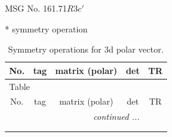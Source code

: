 \documentclass[fleqn,8pt]{jsarticle}
\begin{document}
\setcounter{MaxMatrixCols}{32}

\renewcommand{\tablename}{Table~}
\renewcommand{\figurename}{Figure~}
\begin{center}
\LARGE
MSG No. 161.71\quad$R3c'$
\end{center}
* symmetry operation
\renewcommand{\arraystretch}{1.3}
\begin{longtable}{ccccc}
\caption{Symmetry operations for 3d polar vector.}
 \\
 \hline \hline
No. & tag & matrix (polar) & det & TR \\ \hline \endfirsthead

\multicolumn{4}{l}{\tablename\ \thetable{}} \\
 \hline \hline
No. & tag & matrix (polar) & det & TR \\ \hline \endhead

 \hline \hline
\multicolumn{4}{r}{\footnotesize\it continued ...} \\ \endfoot

 \hline \hline
\multicolumn{4}{r}{} \\ \endlastfoot


\end{longtable}
\end{document}
